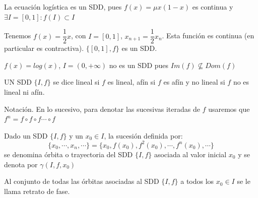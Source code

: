 \begin{nprop}La ecuación logística es un SDD, pues $f(x) = \mu x(1-x)$ es continua y $\exists I = [0,1]: f(I) \subset I$

\end{nprop}

\begin{ejemplo}
	Tenemos $f(x) = \dfrac{1}{2}x$, con $I = [0,1]$, $x_{n+1} = \dfrac{1}{2}x_n$. Esta función es continua (en particular es contractiva). $\{[0,1],f\}$ es un SDD.
\end{ejemplo}
\begin{ejemplo}
	$f(x) = log(x)$, $I=(0,+\infty)$ no es un SDD pues $Im(f) \nsubseteq Dom(f)$
\end{ejemplo}

\begin{ndef}
	UN SDD $\{I,f\}$ se dice lineal si $f$ es lineal, afín si $f$ es afín y no lineal si $f$ no es lineal ni afín.
\end{ndef}

Notación. En lo sucesivo, para denotar las sucesivas iteradas de $f$ usaremos que $f^n = f \circ f \circ f \cdots \circ f$


\begin{ndef}[Órbita]
	Dado un SDD $\{I,f\}$ y un $x_0\in I$, la sucesión definida por:
	\[
	\{x_0,\cdots, x_n , \cdots\} = \{x_0,f(x_0),f^2(x_0),\cdots, f^n(x_0), \cdots\}
	\]
	se denomina órbita o trayectoria del SDD $\{I,f\}$ asociada al valor inicial $x_0$ y se denota por $\gamma(I,f,x_0)$
\end{ndef}

\begin{ndef}
	Al conjunto de todas las órbitas asociadas al SDD $\{I,f\}$  a todos los $x_0 \in I$ se le llama retrato de fase.
\end{ndef}

